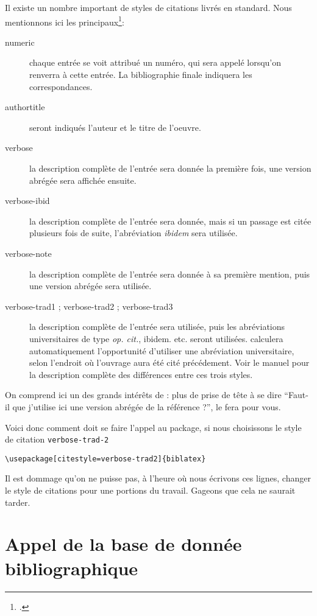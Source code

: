 Il existe un nombre important de styles de citations livrés en standard. Nous mentionnons ici les principaux\footcite[Se reporter à][pour plus de détails.]{biblatex_style}:
\begin{description}
\item[numeric]chaque entrée se voit attribué un numéro, qui sera appelé lorsqu'on renverra à cette entrée. La bibliographie finale indiquera les correspondances.
\item[authortitle]seront indiqués l'auteur et le titre de l'oeuvre.
\item[verbose]la description complète de l'entrée sera donnée la première fois, une version abrégée sera affichée ensuite.
\item[verbose-ibid]la description complète de l'entrée sera donnée, mais si un passage est citée plusieurs fois de suite, l'abréviation \emph{ibidem} sera utilisée.
\item[verbose-note]la description complète de l'entrée sera donnée à sa première mention, puis une version abrégée sera utilisée.
\item[verbose-trad1 ; verbose-trad2 ; verbose-trad3]la description complète de l'entrée sera utilisée, puis les abréviations universitaires de type \emph{op. cit.}, {ibidem.} etc. seront utilisées.  calculera automatiquement l'opportunité d'utiliser une abréviation universitaire, selon l'endroit où l'ouvrage aura été cité précédement. Voir le manuel pour la description complète des différences entre ces trois styles.
\end{description}

On comprend ici un des grands intérêts de \logiciel{\LaTeX} : plus de prise de tête à se dire \enquote{Faut-il que j'utilise ici une version abrégée de la référence ?},  le fera pour vous.

Voici donc comment doit se faire l'appel au package, si nous choisissons le style de citation \verb|verbose-trad-2|
\begin{verbatim}
\usepackage[citestyle=verbose-trad2]{biblatex}
\end{verbatim}

Il est dommage qu'on ne puisse pas, à l'heure où nous écrivons ces lignes, changer le style de citations pour une portions du travail. Gageons que cela ne saurait tarder.

\section{Appel de la base de donnée bibliographique}


